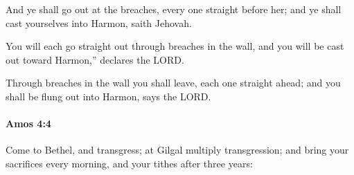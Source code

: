 			\begin{versebox}
					\item[BHS] 
					\item[LXX] 
					\item[ASV] And ye shall go out at the breaches, every one straight before her; and ye shall cast yourselves into Harmon, saith Jehovah.
					\item[NIV] You will each go straight out through breaches in the wall, and you will be cast out toward Harmon,” declares the LORD.
					\item[NRSV] Through breaches in the wall you shall leave, each one straight ahead; and you shall be flung out into Harmon, says the LORD.
			\end{versebox}

		\paragraph{Amos 4:4} %
			\label{AMOS-4-4}

			Come to Bethel, and transgress; at Gilgal multiply transgression; and bring your sacrifices every morning, and your tithes after three years:

